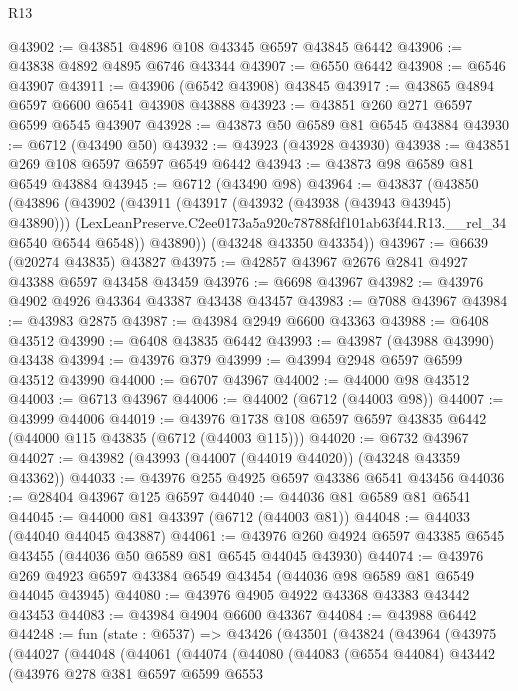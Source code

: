 \begin{lexlean}{R13}
\begin{coremodule}
@43902 := @43851 @4896 @108 @43345 @6597 @43845 @6442
@43906 := @43838 @4892 @4895 @6746 @43344
@43907 := @6550 @6442
@43908 := @6546 @43907
@43911 := @43906 (@6542 @43908) @43845
@43917 := @43865 @4894 @6597 @6600 @6541 @43908 @43888
@43923 := @43851 @260 @271 @6597 @6599 @6545 @43907
@43928 := @43873 @50 @6589 @81 @6545 @43884
@43930 := @6712 (@43490 @50)
@43932 := @43923 (@43928 @43930)
@43938 := @43851 @269 @108 @6597 @6597 @6549 @6442
@43943 := @43873 @98 @6589 @81 @6549 @43884
@43945 := @6712 (@43490 @98)
@43964 := @43837
    (@43850
      (@43896
        (@43902
          (@43911
            (@43917 (@43932 (@43938 (@43943 @43945) @43890)))
            (LexLeanPreserve.C2ee0173a5a920c78788fdf101ab63f44.R13.__rel_34 @6540 @6544 @6548))
          @43890))
      (@43248 @43350 @43354))
@43967 := @6639 (@20274 @43835) @43827
@43975 := @42857 @43967 @2676 @2841 @4927 @43388 @6597 @43458 @43459
@43976 := @6698 @43967
@43982 := @43976 @4902 @4926 @43364 @43387 @43438 @43457
@43983 := @7088 @43967
@43984 := @43983 @2875
@43987 := @43984 @2949 @6600 @43363
@43988 := @6408 @43512
@43990 := @6408 @43835 @6442
@43993 := @43987 (@43988 @43990) @43438
@43994 := @43976 @379
@43999 := @43994 @2948 @6597 @6599 @43512 @43990
@44000 := @6707 @43967
@44002 := @44000 @98 @43512
@44003 := @6713 @43967
@44006 := @44002 (@6712 (@44003 @98))
@44007 := @43999 @44006
@44019 := @43976 @1738 @108 @6597 @6597 @43835 @6442 (@44000 @115 @43835 (@6712 (@44003 @115)))
@44020 := @6732 @43967
@44027 := @43982 (@43993 (@44007 (@44019 @44020)) (@43248 @43359 @43362))
@44033 := @43976 @255 @4925 @6597 @43386 @6541 @43456
@44036 := @28404 @43967 @125 @6597
@44040 := @44036 @81 @6589 @81 @6541
@44045 := @44000 @81 @43397 (@6712 (@44003 @81))
@44048 := @44033 (@44040 @44045 @43887)
@44061 := @43976 @260 @4924 @6597 @43385 @6545 @43455 (@44036 @50 @6589 @81 @6545 @44045 @43930)
@44074 := @43976 @269 @4923 @6597 @43384 @6549 @43454 (@44036 @98 @6589 @81 @6549 @44045 @43945)
@44080 := @43976 @4905 @4922 @43368 @43383 @43442 @43453
@44083 := @43984 @4904 @6600 @43367
@44084 := @43988 @6442
@44248 := fun (state : @6537) =>
  @43426
    (@43501
      (@43824
        (@43964
          (@43975
            (@44027
              (@44048
                (@44061
                  (@44074
                    (@44080
                      (@44083
                        (@6554 @44084)
                        @43442
                        (@43976
                          @278
                          @381
                          @6597
                          @6599
                          @6553

\end{coremodule}
\end{lexlean}
